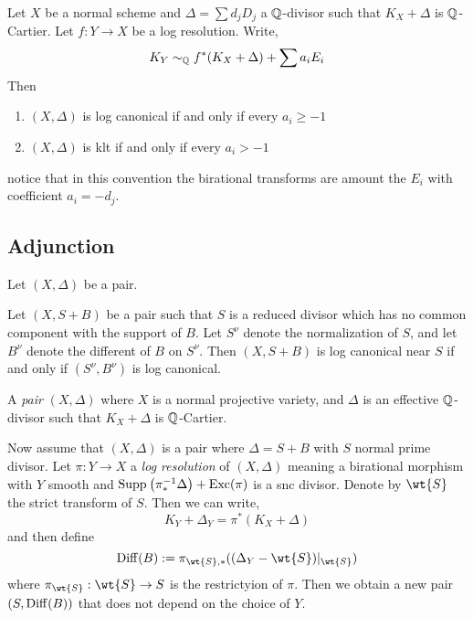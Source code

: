 \documentclass[12pt]{article}
\begin{document}
\begin{lemma}
Let $X$ be a normal scheme and $\Delta = \sum d_j D_j$ a $\mathbb{Q}$-divisor such that $K_X + \Delta$ is $\mathbb{Q}$-Cartier. Let $f : Y \to X$ be a log resolution. Write,
\[ K_Y \sim_{\mathbb{Q}} f^* (K_X + \Delta) + \sum a_i E_i \]
Then
\begin{enumerate}
\item $(X, \Delta)$ is log canonical if and only if every $a_i \ge -1$
\item $(X, \Delta)$ is klt if and only if every $a_i > -1$
\end{enumerate}
notice that in this convention the birational transforms are amount the $E_i$ with coefficient $a_i = -d_j$.
\end{lemma}

\subsection{Adjunction}

Let $(X, \Delta)$ be a pair. 

\begin{theorem}[Kawmata]
Let $(X, S + B)$ be a pair such that $S$ is a reduced divisor which has no common component with the support of $B$. Let $S^\nu$ denote the normalization of $S$, and let $B^\nu$ denote the different of $B$ on $S^\nu$. Then $(X, S + B)$ is log canonical near $S$ if and only if $(S^\nu, B^\nu)$ is log canonical.
\end{theorem}

\begin{defn}
A \textit{pair} $(X, \Delta)$ where $X$ is a normal projective variety, and $\Delta$ is an effective $\mathbb{Q}$-divisor such that $K_X + \Delta$ is $\mathbb{Q}$-Cartier. 
\end{defn}

Now assume that $(X, \Delta)$ is a pair where $\Delta = S + B$ with $S$ normal prime divisor. Let $\pi : Y \to X$ a \textit{log resolution} of $(X, \Delta)$ meaning a birational morphism with $Y$ smooth and $\mathrm{Supp}_{}\left(\pi_*^{-1} \Delta \right) + \operatorname{\mathrm{Exc}}(\pi)$ is a snc divisor. Denote by $\wt{S}$ the strict transform of $S$. Then we can write,
\[ K_Y + \Delta_Y = \pi^* ( K_X + \Delta) \]
and then define
\[ \Diff(B) := \pi_{\wt{S}, *} ((\Delta_Y - \wt{S})|_{\wt{S}}) \]
where $\pi_{\wt{S}} : \wt{S} \to S$ is the restrictyion of $\pi$. Then we obtain a new pair $(S, \mathrm{Diff}(B))$ that does not depend on the choice of $Y$.
\end{document}

